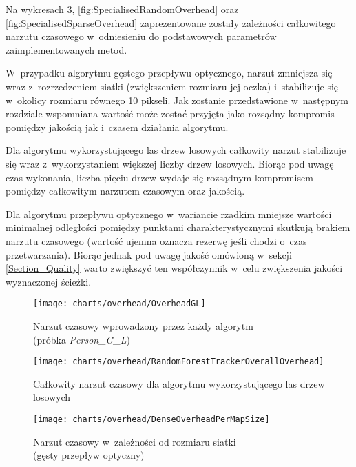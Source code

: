     Na wykresach \ref{fig:SpecialisedDenseOverhead}, \ref{fig:SpecialisedRandomOverhead} oraz \ref{fig:SpecialisedSparseOverhead} zaprezentowane zostały zależności całkowitego narzutu czasowego w~odniesieniu do podstawowych parametrów zaimplementowanych metod.

    W~przypadku algorytmu gęstego przepływu optycznego, narzut zmniejsza się wraz z~rozrzedzeniem siatki (zwiększeniem rozmiaru jej oczka) i~stabilizuje się w~okolicy rozmiaru równego 10 pikseli. Jak zostanie przedstawione w~następnym rozdziale wspomniana wartość może zostać przyjęta jako rozsądny kompromis pomiędzy jakością jak i~czasem działania algorytmu.

    Dla algorytmu wykorzystującego las drzew losowych całkowity narzut stabilizuje się wraz z~wykorzystaniem większej liczby drzew losowych. Biorąc pod uwagę czas wykonania, liczba pięciu drzew wydaje się rozsądnym kompromisem pomiędzy całkowitym narzutem czasowym oraz jakością.

    Dla algorytmu przepływu optycznego w~wariancie rzadkim mniejsze wartości minimalnej odległości pomiędzy punktami charakterystycznymi skutkują brakiem narzutu czasowego (wartość ujemna oznacza rezerwę jeśli chodzi o~czas przetwarzania). Biorąc jednak pod uwagę jakość omówioną w~sekcji \ref{Section_Quality} warto zwiększyć ten współczynnik w~celu zwiększenia jakości wyznaczonej ścieżki.

    \newpage
    \begin{figure}[!ht]
      \centering
      \texttt{[image: charts/overhead/OverheadGL]}
      \caption[Narzut czasowy wprowadzony przez każdy algorytm]
              {Narzut czasowy wprowadzony przez każdy algorytm\\(próbka \textit{Person\_G\_L})}
      \label{fig:OverheadGL}
    \end{figure}

    \begin{figure}[!ht]
      \centering
      \texttt{[image: charts/overhead/RandomForestTrackerOverallOverhead]}
      \caption[Całkowity narzut czasowy dla algorytmu wykorzystującego las drzew losowych]
              {Całkowity narzut czasowy dla algorytmu wykorzystującego las drzew losowych}
      \label{fig:RandomForestTrackerOverhead}
    \end{figure}

    \newpage
    \begin{figure}[!ht]
      \centering
      \texttt{[image: charts/overhead/DenseOverheadPerMapSize]}
      \caption[Narzut czasowy w~zależności od rozmiaru siatki]
              {Narzut czasowy w~zależności od rozmiaru siatki\\(gęsty przepływ optyczny)}
      \label{fig:SpecialisedDenseOverhead}
    \end{figure}

